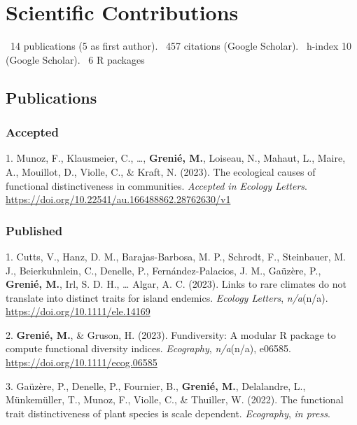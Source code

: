 \documentclass[10pt,a4paper,]{article}
\begin{document}
\hypertarget{scientific-contributions}{%
\section{Scientific Contributions}\label{scientific-contributions}}

\faFile*~14 publications (5 as first author). \faQuoteLeft~457 citations
(Google Scholar). \faHSquare~h-index 10 (Google Scholar). \faRProject~6
R packages

\hypertarget{publications}{%
\subsection{Publications}\label{publications}}

\hypertarget{accepted}{%
\subsubsection{Accepted}\label{accepted}}

\hypertarget{bibliography}{}
\leavevmode{}%
1. Munoz, F., Klausmeier, C., \ldots, \textbf{Grenié, M.}, Loiseau, N.,
Mahaut, L., Maire, A., Mouillot, D., Violle, C., \& Kraft, N. (2023).
The ecological causes of functional distinctiveness in communities.
\emph{Accepted in Ecology Letters}.
\url{https://doi.org/10.22541/au.166488862.28762630/v1}

\hypertarget{published}{%
\subsubsection{Published}\label{published}}

\hypertarget{bibliography}{}
\leavevmode{}%
1. Cutts, V., Hanz, D. M., Barajas-Barbosa, M. P., Schrodt, F.,
Steinbauer, M. J., Beierkuhnlein, C., Denelle, P., Fernández-Palacios,
J. M., Gaüzère, P., \textbf{Grenié, M.}, Irl, S. D. H., \ldots{} Algar,
A. C. (2023). Links to rare climates do not translate into distinct
traits for island endemics. \emph{Ecology Letters}, \emph{n/a}(n/a).
\url{https://doi.org/10.1111/ele.14169}

\leavevmode{}%
2. \textbf{Grenié, M.}, \& Gruson, H. (2023). Fundiversity: A modular R
package to compute functional diversity indices. \emph{Ecography},
\emph{n/a}(n/a), e06585. \url{https://doi.org/10.1111/ecog.06585}

\leavevmode{}%
3. Gaüzère, P., Denelle, P., Fournier, B., \textbf{Grenié, M.},
Delalandre, L., Münkemüller, T., Munoz, F., Violle, C., \& Thuiller, W.
(2022). The functional trait distinctiveness of plant species is scale
dependent. \emph{Ecography}, \emph{in press}.
\end{document}

